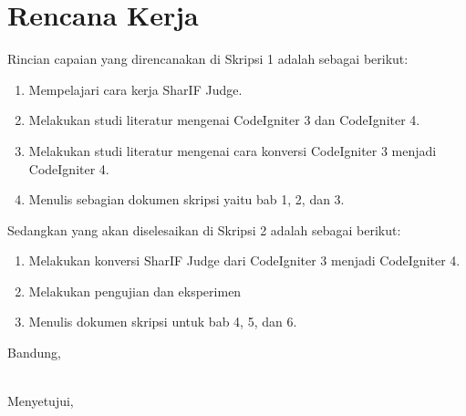 \documentclass[a4paper,twoside]{article}
\begin{document}
\section{Rencana Kerja}
Rincian capaian yang direncanakan di Skripsi 1 adalah sebagai berikut:
\begin{enumerate}
\item Mempelajari cara kerja SharIF Judge.
\item Melakukan studi literatur mengenai CodeIgniter 3 dan CodeIgniter 4.
\item Melakukan studi literatur mengenai cara konversi CodeIgniter 3 menjadi CodeIgniter 4.
\item Menulis sebagian dokumen skripsi yaitu bab 1, 2, dan 3.
\end{enumerate}

Sedangkan yang akan diselesaikan di Skripsi 2 adalah sebagai berikut:
\begin{enumerate}
\item Melakukan konversi SharIF Judge dari CodeIgniter 3 menjadi CodeIgniter 4.
\item Melakukan pengujian dan eksperimen
\item Menulis dokumen skripsi untuk bab 4, 5, dan 6.
\end{enumerate}

\vspace{1cm}
\centering Bandung, \tanggal\\
\vspace{2cm} \nama \\ 
\vspace{1cm}

Menyetujui, \\
\end{document}
